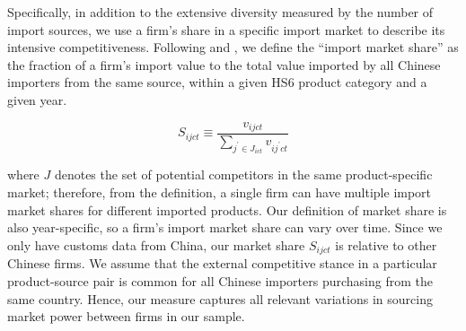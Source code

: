 Specifically, in addition to the extensive diversity measured by the number of import sources, we use a firm's share in a specific import market to describe its intensive competitiveness. Following \cite{aik2014} and \cite{devereux2017}, we define the ``import market share'' as the fraction of a firm's import value to the total value imported by all Chinese importers from the same source, within a given HS6 product category and a given year. 

$$
S_{ijct} \equiv \frac{v_{ijct}}{\sum_{j^{\prime} \in J_{ict}} v_{ij^{\prime}ct}}
$$

where $J$ denotes the set of potential competitors in the same product-specific market; therefore, from the definition, a single firm can have multiple import market shares for different imported products. Our definition of market share is also year-specific, so a firm’s import market share can vary over time. Since we only have customs data from China, our market share $S_{ijct}$ is relative to other Chinese firms. We assume that the external competitive stance in a particular product-source pair is common for all Chinese importers purchasing from the same country. Hence, our measure captures all relevant variations in sourcing market power between firms in our sample.


